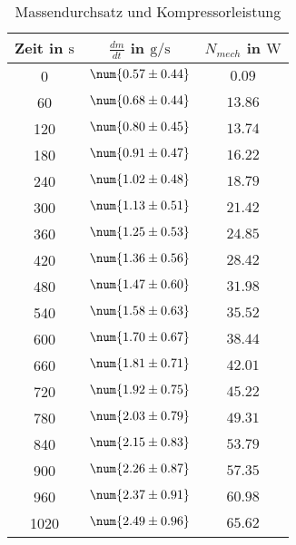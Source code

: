 \begin{table} 
 \centering 
 \begin{tabular}{S S S } 
 \toprule  
{Zeit in $\si{\second}$} & {$\frac{dm}{dt}$ in $\si{\gram \per \second}$} & {$N_{mech}$ in $\si{\watt}$}  \\ 
  & $\num{ 0.57 \pm 0.44 }$ & $\num{ 0.09  }$ \\ 
60  & $\num{ 0.68 \pm 0.44 }$ & $\num{ 13.86  }$ \\ 
120  & $\num{ 0.80 \pm 0.45 }$ & $\num{ 13.74  }$ \\ 
180  & $\num{ 0.91 \pm 0.47 }$ & $\num{ 16.22  }$ \\ 
240  & $\num{ 1.02 \pm 0.48 }$ & $\num{ 18.79  }$ \\ 
300  & $\num{ 1.13 \pm 0.51 }$ & $\num{ 21.42  }$ \\ 
360  & $\num{ 1.25 \pm 0.53 }$ & $\num{ 24.85  }$ \\ 
420  & $\num{ 1.36 \pm 0.56 }$ & $\num{ 28.42  }$ \\ 
480  & $\num{ 1.47 \pm 0.60 }$ & $\num{ 31.98  }$ \\ 
540  & $\num{ 1.58 \pm 0.63 }$ & $\num{ 35.52  }$ \\ 
600  & $\num{ 1.70 \pm 0.67 }$ & $\num{ 38.44  }$ \\ 
660  & $\num{ 1.81 \pm 0.71 }$ & $\num{ 42.01  }$ \\ 
720  & $\num{ 1.92 \pm 0.75 }$ & $\num{ 45.22  }$ \\ 
780  & $\num{ 2.03 \pm 0.79 }$ & $\num{ 49.31  }$ \\ 
840  & $\num{ 2.15 \pm 0.83 }$ & $\num{ 53.79  }$ \\ 
900  & $\num{ 2.26 \pm 0.87 }$ & $\num{ 57.35  }$ \\ 
960  & $\num{ 2.37 \pm 0.91 }$ & $\num{ 60.98  }$ \\ 
1020  & $\num{ 2.49 \pm 0.96 }$ & $\num{ 65.62  }$ \\ 
\bottomrule 
 \end{tabular} 
 \caption{Massendurchsatz und Kompressorleistung} 
 \label{tab: dmdtNmech} 
  \end{table}